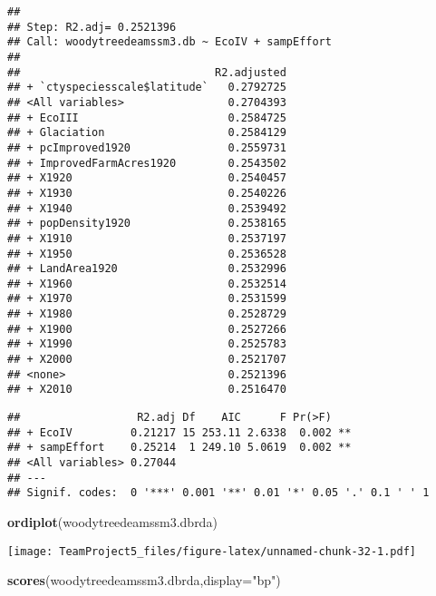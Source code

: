 \documentclass[
]{article}
\newenvironment{Shaded}{\begin{snugshade}}{\end{snugshade}}
\newcommand{\DataTypeTok}[1]{\textcolor[rgb]{0.13,0.29,0.53}{#1}}
\newcommand{\KeywordTok}[1]{\textcolor[rgb]{0.13,0.29,0.53}{\textbf{#1}}}
\newcommand{\NormalTok}[1]{#1}
\newcommand{\OperatorTok}[1]{\textcolor[rgb]{0.81,0.36,0.00}{\textbf{#1}}}
\newcommand{\StringTok}[1]{\textcolor[rgb]{0.31,0.60,0.02}{#1}}
\begin{document}
\begin{verbatim}
## 
## Step: R2.adj= 0.2521396 
## Call: woodytreedeamssm3.db ~ EcoIV + sampEffort 
##  
##                              R2.adjusted
## + `ctyspeciesscale$latitude`   0.2792725
## <All variables>                0.2704393
## + EcoIII                       0.2584725
## + Glaciation                   0.2584129
## + pcImproved1920               0.2559731
## + ImprovedFarmAcres1920        0.2543502
## + X1920                        0.2540457
## + X1930                        0.2540226
## + X1940                        0.2539492
## + popDensity1920               0.2538165
## + X1910                        0.2537197
## + X1950                        0.2536528
## + LandArea1920                 0.2532996
## + X1960                        0.2532514
## + X1970                        0.2531599
## + X1980                        0.2528729
## + X1900                        0.2527266
## + X1990                        0.2525783
## + X2000                        0.2521707
## <none>                         0.2521396
## + X2010                        0.2516470
\end{verbatim}

\begin{Shaded}
\end{Shaded}

\begin{verbatim}
##                  R2.adj Df    AIC      F Pr(>F)   
## + EcoIV         0.21217 15 253.11 2.6338  0.002 **
## + sampEffort    0.25214  1 249.10 5.0619  0.002 **
## <All variables> 0.27044                           
## ---
## Signif. codes:  0 '***' 0.001 '**' 0.01 '*' 0.05 '.' 0.1 ' ' 1
\end{verbatim}

\begin{Shaded}
\begin{Highlighting}[]
\KeywordTok{ordiplot}\NormalTok{(woodytreedeamssm3.dbrda)}
\end{Highlighting}
\end{Shaded}

\texttt{[image: TeamProject5\_files/figure-latex/unnamed-chunk-32-1.pdf]}

\begin{Shaded}
\begin{Highlighting}[]
\KeywordTok{scores}\NormalTok{(woodytreedeamssm3.dbrda,}\DataTypeTok{display=}\StringTok{"bp"}\NormalTok{)}
\end{Highlighting}
\end{Shaded}
\end{document}
